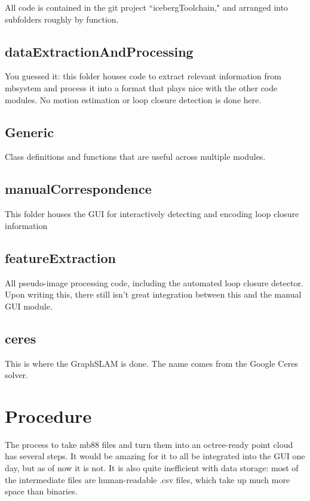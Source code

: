 \documentclass[12pt]{amsart}
\begin{document}
All code is contained in the git project ``icebergToolchain," and arranged into subfolders roughly by function.

\subsection{dataExtractionAndProcessing}

You guessed it: this folder houses code to extract relevant information from mbsystem and process it into a format that plays nice with the other code modules. No motion estimation or loop closure detection is done here.

\subsection{Generic}

Class definitions and functions that are useful across multiple modules.

\subsection{manualCorrespondence}

This folder houses the GUI for interactively detecting and encoding loop closure information 

\subsection{featureExtraction}

All pseudo-image processing code, including the automated loop closure detector. Upon writing this, there still isn't great integration between this and the manual GUI module.

\subsection{ceres}

This is where the GraphSLAM is done. The name comes from the Google Ceres solver.

\section{Procedure}

The process to take mb88 files and turn them into an octree-ready point cloud has several steps. It would be amazing for it to all be integrated into the GUI one day, but as of now it is not. It is also quite inefficient with data storage: most of the intermediate files are human-readable .csv files, which take up much more space than binaries.
\end{document}
